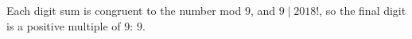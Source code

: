 Each digit sum is congruent to the number mod $9$, and $9\mid2018!$, so the final digit is a positive multiple of $9$: $\boxed{9}$.
